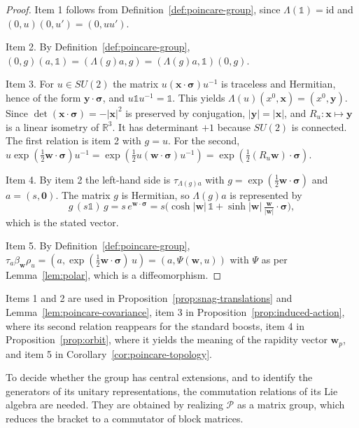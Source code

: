\begin{proof}
	Item 1 follows from Definition~\ref{def:poincare-group}, since $\Lambda(\mathbb{1})=\mathrm{id}$ and $(0,u)(0,u')=(0,uu')$.
	
	Item 2. By Definition~\ref{def:poincare-group}, $(0,g)(a,\mathbb{1})=(\Lambda(g)a,g)=(\Lambda(g)a,\mathbb{1})(0,g)$.
	
	Item 3. For $u\in SU(2)$ the matrix $u(\mathbf{x}\cdot\boldsymbol{\sigma})u^{-1}$ is traceless and Hermitian, hence of the form $\mathbf{y}\cdot\boldsymbol{\sigma}$, and $u\mathbb{1}u^{-1}=\mathbb{1}$. This yields $\Lambda(u)(x^0,\mathbf{x})=(x^0,\mathbf{y})$. Since $\det(\mathbf{x}\cdot\boldsymbol{\sigma})=-|\mathbf{x}|^2$ is preserved by conjugation, $|\mathbf{y}|=|\mathbf{x}|$, and $R_u:\mathbf{x}\mapsto\mathbf{y}$ is a linear isometry of $\mathbb{R}^3$. It has determinant $+1$ because $SU(2)$ is connected. The first relation is item 2 with $g=u$. For the second, $u\exp(\tfrac12\mathbf{w}\cdot\boldsymbol{\sigma})u^{-1}=\exp(\tfrac12u(\mathbf{w}\cdot\boldsymbol{\sigma})u^{-1})=\exp(\tfrac12(R_u\mathbf{w})\cdot\boldsymbol{\sigma})$.
	
	Item 4. By item 2 the left-hand side is $\tau_{\Lambda(g)a}$ with $g=\exp(\tfrac12\mathbf{w}\cdot\boldsymbol{\sigma})$ and $a=(s,\mathbf{0})$. The matrix $g$ is Hermitian, so $\Lambda(g)a$ is represented by
	\begin{equation*}
		g\,(s\mathbb{1})\,g=s\,e^{\mathbf{w}\cdot\boldsymbol{\sigma}}=s\Big(\cosh|\mathbf{w}|\,\mathbb{1}+\sinh|\mathbf{w}|\,\tfrac{\mathbf{w}}{|\mathbf{w}|}\cdot\boldsymbol{\sigma}\Big),
	\end{equation*}
	which is the stated vector.
	
	Item 5. By Definition~\ref{def:poincare-group}, $\tau_a\beta_{\mathbf{w}}\rho_u=(a,\exp(\tfrac12\mathbf{w}\cdot\boldsymbol{\sigma})\,u)=(a,\Psi(\mathbf{w},u))$ with $\Psi$ as per Lemma~\ref{lem:polar}, which is a diffeomorphism.
\end{proof}

\noindent Items 1 and 2 are used in Proposition~\ref{prop:snag-translations} and Lemma~\ref{lem:poincare-covariance}, item 3 in Proposition~\ref{prop:induced-action}, where its second relation reappears for the standard boosts, item 4 in Proposition~\ref{prop:orbit}, where it yields the meaning of the rapidity vector $\mathbf{w}_p$, and item 5 in Corollary~\ref{cor:poincare-topology}.

To decide whether the group has central extensions, and to identify the generators of its unitary representations, the commutation relations of its Lie algebra are needed. They are obtained by realizing $\mathcal{P}$ as a matrix group, which reduces the bracket to a commutator of block matrices.


